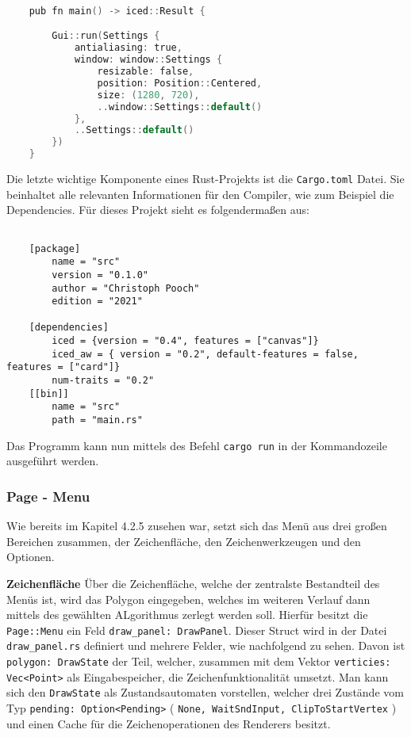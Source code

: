 \begin{lstlisting}[language=C]
  
    pub fn main() -> iced::Result {

        Gui::run(Settings {
            antialiasing: true,
            window: window::Settings {
                resizable: false,
                position: Position::Centered,
                size: (1280, 720),
                ..window::Settings::default()
            },
            ..Settings::default()
        })
    }

\end{lstlisting}

Die letzte wichtige Komponente eines Rust-Projekts ist die \lstinline{Cargo.toml} Datei. Sie beinhaltet alle relevanten Informationen für den Compiler, wie zum Beispiel die 
Dependencies. Für dieses Projekt sieht es folgendermaßen aus:

\begin{lstlisting}
  
    [package]
        name = "src"
        version = "0.1.0"
        author = "Christoph Pooch"
        edition = "2021"

    [dependencies]
        iced = {version = "0.4", features = ["canvas"]}
        iced_aw = { version = "0.2", default-features = false, features = ["card"]}
        num-traits = "0.2"
    [[bin]]
        name = "src"
        path = "main.rs"

\end{lstlisting}

Das Programm kann nun mittels des Befehl \lstinline{cargo run} in der Kommandozeile ausgeführt werden.

\subsubsection{Page - Menu}
Wie bereits im Kapitel 4.2.5 zusehen war, setzt sich das Menü aus drei großen Bereichen zusammen, der Zeichenfläche, den Zeichenwerkzeugen und den Optionen. \linebreak

\textbf{Zeichenfläche}\linebreak
Über die Zeichenfläche, welche der zentralste Bestandteil des Menüs ist, wird das Polygon eingegeben, welches im weiteren Verlauf dann mittels des gewählten ALgorithmus zerlegt werden soll.
Hierfür besitzt die \lstinline{Page::Menu} ein Feld \lstinline{draw_panel: DrawPanel}. Dieser Struct wird in der Datei \lstinline{draw_panel.rs} definiert und mehrere Felder, wie nachfolgend zu sehen. 
Davon ist \lstinline{polygon: DrawState} der Teil, welcher, zusammen mit dem Vektor \lstinline{verticies: Vec<Point>} als Eingabespeicher, die Zeichenfunktionalität umsetzt. Man kann sich den \lstinline{DrawState} als Zustandsautomaten 
vorstellen, welcher drei Zustände vom Typ \lstinline{pending: Option<Pending>} ( \lstinline{None, WaitSndInput, ClipToStartVertex} ) und einen Cache für die Zeichenoperationen des Renderers besitzt. 

